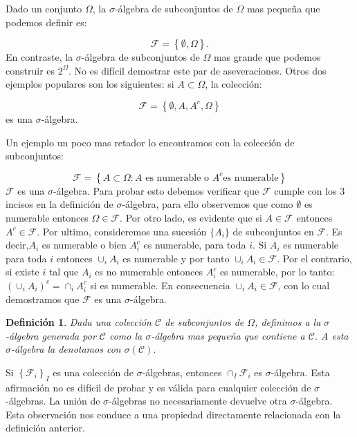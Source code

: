 \documentclass{extreport}
\theoremstyle{definicion}
\newtheorem{definition}{Definición}[chapter]
\theoremstyle{propiedad}
\theoremstyle{teorema}
\begin{document}
Dado un conjunto $\Omega$, la $\sigma$-álgebra de subconjuntos de $\Omega$ mas pequeña que podemos definir es:

$$
\mathcal{F} = \left\{\emptyset, \Omega\right\}.
$$
En contraste, la $\sigma$-álgebra de subconjuntos de $\Omega$  mas grande que podemos construir es $2^\Omega$. No es difícil demostrar este par de aseveraciones. Otros dos ejemplos populares son los siguientes: si $A\subset \Omega$, la colección:

$$
\mathcal{F} = \left\{\emptyset, A, A^c,\Omega\right\}
$$
es una $\sigma$-álgebra.

Un ejemplo un poco mas retador lo encontramos con la colección de subconjuntos:

$$
\mathcal{F} = \left\{A\subset \Omega: A \text{ es numerable o } A^c \text{es numerable}\right\}
$$
$\mathcal{F}$ es una $\sigma$-álgebra. Para probar esto debemos verificar que $\mathcal{F}$ cumple con los 3 incisos en la definición de $\sigma$-álgebra, para ello observemos que como $\emptyset$ es numerable entonces $\Omega\in \mathcal{F}$. Por otro lado, es evidente que si $A\in \mathcal{F}$ entonces $A^c\in \mathcal{F}$. Por ultimo, consideremos una sucesión $\{A_i\}$ de subconjuntos en $\mathcal{F}$. Es decir,$A_i$ es numerable o bien $A_i^c$ es numerable, para toda $i$. Si $A_i$ es numerable para toda $i$ entonces $\cup_iA_i$ es numerable y por tanto $\cup_i A_i\in \mathcal{F}$. Por el contrario, si existe $i$ tal que $A_i$ es no numerable entonces $A_i^c$ es numerable, por lo tanto: $\left(\cup_iA_i\right)^c = \cap_iA_i^c$ si es numerable. En consecuencia $\cup_iA_i\in \mathcal{F}$, con lo cual demostramos que $\mathcal{F}$ es una $\sigma$-álgebra.

\begin{definition}
Dada una colección $\mathcal{C}$ de subconjuntos de $\Omega$, definimos a la $\sigma$-álgebra generada por $\mathcal{C}$ como la $\sigma$-álgebra mas pequeña que contiene a $\mathcal{C}$. A esta $\sigma$-álgebra la denotamos con $\sigma(\mathcal{C})$.    
\end{definition}

Si $\left\{\mathcal{F}_i\right\}_I$ es una colección de $\sigma$-álgebras, entonces $\cap_I \mathcal{F}_i$ es $\sigma$-álgebra.  Esta afirmación no es difícil de probar y es válida para cualquier colección de $\sigma$-álgebras. La unión de $\sigma$-álgebras no necesariamente devuelve otra $\sigma$-álgebra. Esta observación nos conduce a una propiedad directamente relacionada con la definición anterior.
\end{document}
